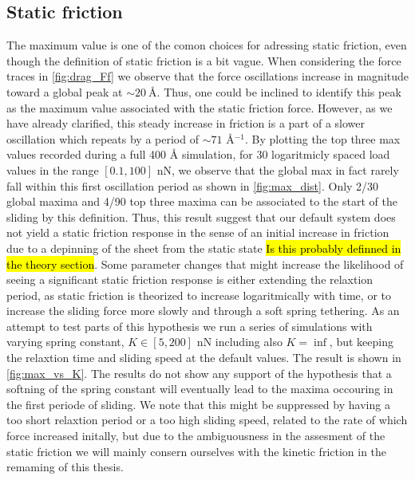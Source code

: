 \subsection{Static friction} 
The maximum value is one of the comon choices for adressing static friction,
even though the definition of static friction is a bit vague. When considering
the force traces in \cref{fig:drag_Ff} we observe that the force oscillations
increase in magnitude toward a global peak at $\sim \SI{20}{\text{Å}}$. Thus,
one could be inclined to identify this peak as the maximum value associated with
the static friction force. However, as we have already clarified, this steady
increase in friction is a part of a slower oscillation which repeats by a period
of $\sim 71$ Å$^{-1}$. By plotting the top three max values recorded during a
full 400 Å simulation, for 30 logaritmicly spaced load values in the range
$[0.1, 100]$ nN, we observe that the global max in fact rarely fall within this
first oscillation period as shown in \cref{fig:max_dist}. Only 2/30 global
maxima and 4/90 top three maxima can be associated to the start of the sliding
by this definition. Thus, this result suggest that our default system does not
yield a static friction response in the sense of an initial increase in friction
due to a depinning of the sheet from the static state \hl{Is this probably
definned in the theory section}. Some parameter changes that might increase the
likelihood of seeing a significant static friction response is either extending
the relaxtion period, as static friction is theorized to increase logaritmically
with time, or to increase the sliding force more slowly and through a soft spring tethering. As an attempt to test parts of this hypothesis we run a series of simulations with varying spring constant, $K\in [5, 200]$ nN including also $K = \inf$, but keeping the relaxtion time and sliding speed at the default values. The result is shown in \cref{fig:max_vs_K}. The results do not show any support of the hypothesis that a softning of the spring constant will eventually lead to the maxima occouring in the first periode of sliding. We note that this might be suppressed by having a too short relaxtion period or a too high sliding speed, related to the rate of which force increased initally, but due to the ambiguousness in the assesment of the static friction we will mainly consern ourselves with the kinetic friction in the remaming of this thesis.







